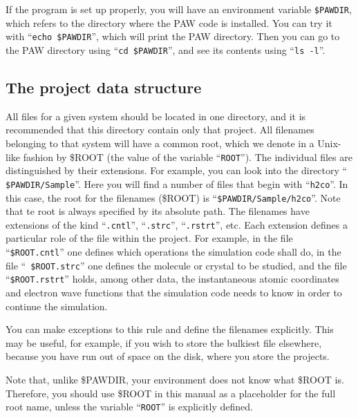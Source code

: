 \documentclass[final,12pt,makeidx,DIV=calc]{article}
\begin{document}
If the program is set up properly, you will have an
environment variable {\tt \$PAWDIR}, which refers to the directory
where the PAW code is installed. You can try it with ``{\tt echo
  \$PAWDIR}'', which will print the PAW directory. Then you can go to
the PAW directory using ``{\tt cd \$PAWDIR}'', and see its contents
using ``{\tt ls -l}''.


\subsection{The project data structure}
\label{ROOT}
\begin{sloppypar}
All files for a given system should be located in one directory, and
it is recommended that this directory contain only that project.  All
filenames belonging to that system will have a common root, which we
denote in a Unix-like fashion by \$ROOT (the value of the variable
``{\tt ROOT}''). The individual files are distinguished by their
extensions. For example, you can look into the directory ``{\tt
  \$PAWDIR/Sample}''. Here you will find a number of files that begin
with ``{\tt h2co}''. In this case, the root for the filenames (\$ROOT)
is ``{\tt \$PAWDIR/Sample/h2co}''. Note that te root is always
specified by its absolute path. The filenames have extensions of the
kind ``{\tt .cntl}'', ``{\tt .strc}'', ``{\tt .rstrt}'', etc.  Each
extension defines a particular role of the file within the project.
For example, in the file ``{\tt \$ROOT.cntl}'' one defines which
operations the simulation code shall do, in the file ``{\tt
  \$ROOT.strc}'' one defines the molecule or crystal to be studied,
and the file ``{\tt \$ROOT.rstrt}'' holds, among other data, the
instantaneous atomic coordinates and electron wave functions that the
simulation code needs to know in order to continue the simulation.
\end{sloppypar}

You can make exceptions to this rule and define the filenames
explicitly. This may be useful, for example, if you wish to store the
bulkiest file elsewhere, because you have run out of space on the
disk, where you store the projects.

Note that, unlike \$PAWDIR, your environment does not know what \$ROOT
is. Therefore, you should use \$ROOT in this manual as a placeholder for
the full root name, unless the variable ``{\tt ROOT}'' is
explicitly defined. 
\end{document}
